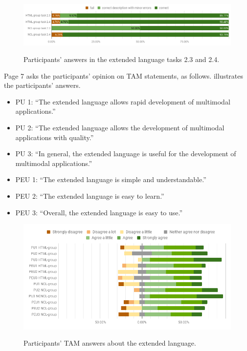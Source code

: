 \begin{figure}[!ht]
\begin{center}
	\includegraphics[width=14cm, keepaspectratio]{img/img24.png}
    \captionvspace
	\caption{Participants’ answers in the extended language tasks 2.3 and 2.4.}
    \captionvspace
	\label{fig:lang-res2}
\end{center}
\end{figure}

Page 7 asks the participants’ opinion on TAM statements, as follows.
 illustrates the participants’ answers.

\begin{itemize}
	\item PU 1: “The extended language allows rapid development of multimodal
	applications.”
	\item PU 2: “The extended language allows the development of multimodal
	applications with quality.”
	\item PU 3: “In general, the extended language is useful for the development
	of multimodal applications.”
	\item PEU 1: “The extended language is simple and understandable.”
	\item PEU 2: “The extended language is easy to learn.”
	\item PEU 3: “Overall, the extended language is easy to use.”
\end{itemize}

\begin{figure}[!ht]
\begin{center}
	\includegraphics[width=14cm, keepaspectratio]{img/img25.png}
    \captionvspace
	\caption{Participants’ TAM answers about the extended language.}
    \captionvspace
	\label{fig:lang-res3}
\end{center}
\end{figure}

